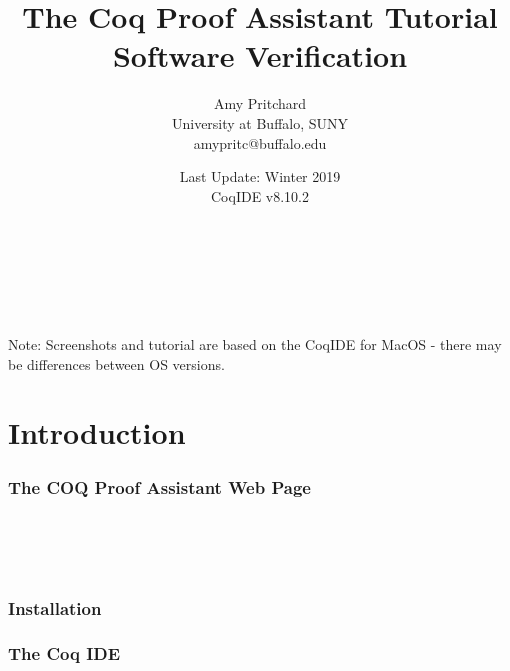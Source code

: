 \documentclass{article}
\title{\textbf{The Coq Proof Assistant Tutorial} 
	\\ Software Verification}
\author{Amy Pritchard 
	\\ University at Buffalo, SUNY
	\\ amypritc@buffalo.edu}
\date{Last Update: Winter 2019 
	\\ CoqIDE v8.10.2}
\begin{document}
\maketitle


~\\~\\~\\
\begin{minipage}{\linewidth}
        \label{fig:CoqAbout} 
\end{minipage}

\vfill
\noindent
{\footnotesize Note: Screenshots and tutorial are based on the CoqIDE for MacOS - there may be differences between OS versions. }

\newpage
\tableofcontents


\newpage
\part{Introduction}
	\label{Part: intro}
\section{The COQ Proof Assistant Web Page} 
	\label{Sec: webpage}
	

~\\~\\~\\
\section{Installation} 
	\label{Sec: installation}
	 


\newpage
\section{The Coq IDE} 
	\label{Sec: ide}
	
\end{document}
